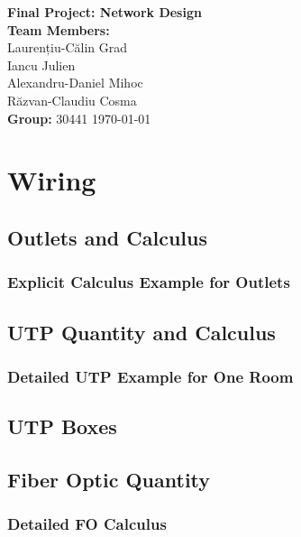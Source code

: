 \documentclass[12pt]{report}
\begin{document}
\begin{titlepage}
    \centering
    \vspace*{1cm}
    \Huge\textbf{Final Project: Network Design}\\[3.5cm]
    \Large \textbf{Team Members:}\\[0.5cm]
    \large Laurențiu-Călin Grad \\
    Iancu Julien \\
    Alexandru-Daniel Mihoc \\
    Răzvan-Claudiu Cosma\\[1cm]
    \textbf{Group:} 30441
    \vfill
    \today
\end{titlepage}

\tableofcontents
\newpage

\chapter{Wiring}

\section{Outlets and Calculus}

\subsection{Explicit Calculus Example for Outlets}

\section{UTP Quantity and Calculus}

\subsection{Detailed UTP Example for One Room}

\section{UTP Boxes}

\section{Fiber Optic Quantity}

\subsection{Detailed FO Calculus}
\end{document}
